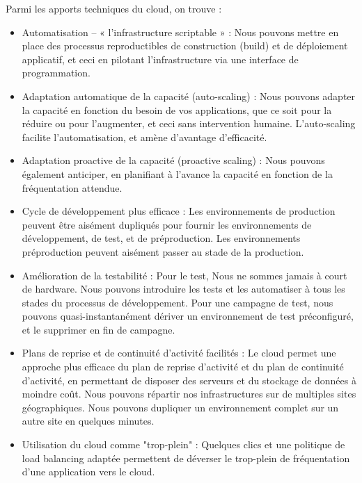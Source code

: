\documentclass[a4paper, 12pt]{report}
\begin{document}
\begin{itemize}
Parmi les apports techniques du cloud, on trouve : 
 
\begin{itemize}
	\item 
	Automatisation – « l'infrastructure scriptable » : Nous pouvons mettre en place des processus reproductibles de construction (build) et de déploiement applicatif, et ceci en pilotant l'infrastructure via une interface de programmation. 
 
\item	Adaptation automatique de la capacité (auto-scaling) : Nous pouvons adapter la capacité en fonction du besoin de vos applications, que ce soit pour la réduire ou pour l'augmenter, et ceci sans intervention humaine. L'auto-scaling facilite l'automatisation, et amène d'avantage d'efficacité. 
 
\item	Adaptation proactive de la capacité (proactive scaling) : Nous pouvons également anticiper, en planifiant à l'avance la capacité en fonction de la fréquentation attendue. 
 
\item Cycle de développement plus efficace : Les environnements de production peuvent être aisément dupliqués pour fournir les environnements de développement, de test, et de préproduction. Les environnements préproduction peuvent aisément passer au stade de la production. 
 
\item	Amélioration de la testabilité : Pour le test, Nous ne sommes jamais à court de hardware. Nous pouvons introduire les tests et les automatiser à tous les stades du processus de développement. Pour une campagne de test, nous pouvons quasi-instantanément dériver un environnement de test préconfiguré, et le supprimer en fin de campagne. 
 
\item	Plans de reprise et de continuité d'activité facilités : Le cloud permet une approche plus efficace du plan de reprise d'activité et du plan de continuité d'activité, en permettant de disposer des serveurs et du stockage de données à moindre coût. Nous pouvons répartir nos infrastructures sur de multiples sites géographiques. Nous pouvons dupliquer un environnement complet sur un autre site en quelques minutes. 
 
\item	Utilisation du cloud comme "trop-plein" : Quelques clics et une politique de load balancing adaptée permettent de déverser le trop-plein de fréquentation d'une application vers le cloud.
\end{itemize}


\end{itemize}
\end{document}

